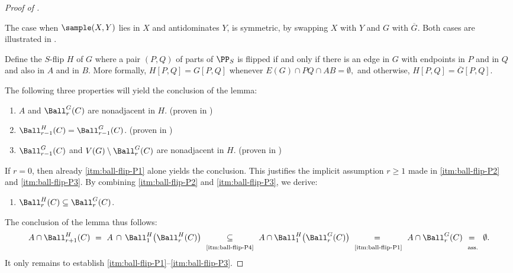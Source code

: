 \begin{proof}[Proof of ]
\begin{claimproof}
The case when $\sample(X,Y)$ lies in $X$ and antidominates $Y$, is symmetric, by swapping $X$ with $Y$ and $G$ with $\overline G$.
    Both cases are illustrated in .
    \end{claimproof}
    \begin{center}
        
        \label{fig:ball-flip-crossing}
    \end{center}

    Define the $S$-flip $H$ of $G$ where a pair $(P,Q)$ of parts of $\PP_S$ is flipped if and only if there is an edge in $G$ with endpoints in $P$ and in $Q$ and also in $A$ and in $B$. More formally, $H[P,Q]=G[P,Q]$ whenever
    $E(G) \cap PQ \cap AB =
    \emptyset,$
    and otherwise, $H[P,Q]=\overline G[P,Q]$.

    The following three properties will yield the conclusion of the lemma:
    \begin{enumerate}[label=(P\arabic*), ref=P\arabic*]
        \item\label{itm:ball-flip-P1} $A$ and $\Ball_{r}^G(C) $ are nonadjacent in $H$.
        \hfill (proven in )
        \item\label{itm:ball-flip-P2} $\Ball_{r-1}^H(C)=\Ball_{r-1}^G(C)$.
        \hfill (proven in )
        \item\label{itm:ball-flip-P3}$\Ball_{r-1}^G(C)$ and $V(G) \setminus \Ball_{r}^G(C)$ are nonadjacent in $H$.
        \hfill (proven in )
    \end{enumerate}
    If $r = 0$, then already \ref{itm:ball-flip-P1} alone yields the conclusion. This justifies the implicit assumption $r \geq 1$ made in  \ref{itm:ball-flip-P2} and \ref{itm:ball-flip-P3}.
    By combining \ref{itm:ball-flip-P2} and \ref{itm:ball-flip-P3}, we derive:
    \begin{enumerate}[label=(P\arabic*), ref=P\arabic*,start = 4]
        \item\label{itm:ball-flip-P4}  $\Ball_{r}^H(C) \subseteq \Ball_{r}^G(C)$.
    \end{enumerate}
    The conclusion of the lemma thus follows:
    \[
       A \cap \Ball_{r+1}^H(C)
       \
    =
    \
       A \,\cap\, \Ball_1^H\big(\Ball_r^H(C)\big)
       \  \underset{\rule{0pt}{8pt}\text{\ref{itm:ball-flip-P4}}}{\subseteq} \
       A \cap \Ball_1^H\big(\Ball_r^G(C)\big)
       \  \underset{\rule{0pt}{8pt}\text{\ref{itm:ball-flip-P1}}}{=\vphantom{\subseteq}} \
       A \cap \Ball_r^G(C)
       \  \underset{\rule{0pt}{8pt}\text{ass.}}{=\vphantom{\subseteq}} \
       \emptyset.
    \]
    It only remains to establish \ref{itm:ball-flip-P1}--\ref{itm:ball-flip-P3}.


\end{proof}
